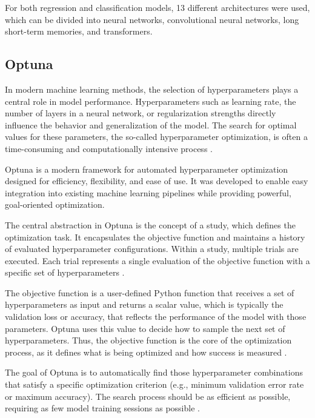 For both regression and classification models, 13 different architectures were used, which can be divided into neural networks, convolutional neural networks, long short-term memories, and transformers.

\subsection{Optuna}

In modern machine learning methods, the selection of hyperparameters plays a central role in model performance.
Hyperparameters such as learning rate, the number of layers in a neural network, or regularization strengths directly influence the behavior and generalization of the model.
The search for optimal values for these parameters, the so-called hyperparameter optimization, is often a time-consuming and computationally intensive process \cite{hyperparameter-importance}.

Optuna is a modern framework for automated hyperparameter optimization designed for efficiency, flexibility, and ease of use.
It was developed to enable easy integration into existing machine learning pipelines while providing powerful, goal-oriented optimization.

The central abstraction in Optuna is the concept of a study, which defines the optimization task.
It encapsulates the objective function and maintains a history of evaluated hyperparameter configurations.
Within a study, multiple trials are executed.
Each trial represents a single evaluation of the objective function with a specific set of hyperparameters \cite{optuna-basics}.

The objective function is a user-defined Python function that receives a set of hyperparameters as input and returns a scalar value, which is typically the validation loss or accuracy, that reflects the performance of the model with those parameters.
Optuna uses this value to decide how to sample the next set of hyperparameters.
Thus, the objective function is the core of the optimization process, as it defines what is being optimized and how success is measured \cite{optuna-basics}.

The goal of Optuna is to automatically find those hyperparameter combinations that satisfy a specific optimization criterion (e.g., minimum validation error rate or maximum accuracy).
The search process should be as efficient as possible, requiring as few model training sessions as possible \cite{optuna-hyperparameters}.

